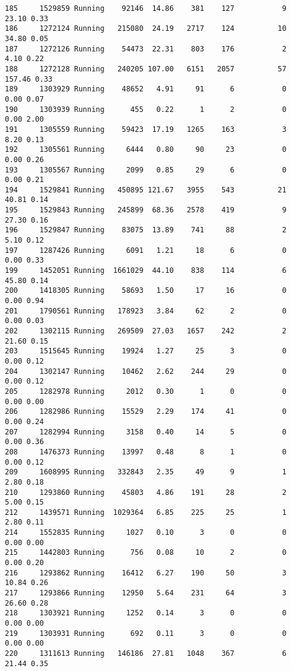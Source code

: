 \documentclass[
]{article}
\begin{document}
\begin{verbatim}
185     1529859 Running    92146  14.86    381    127           9   23.10 0.33
186     1272124 Running   215080  24.19   2717    124          10   34.80 0.05
187     1272126 Running    54473  22.31    803    176           2    4.10 0.22
188     1272128 Running   240205 107.00   6151   2057          57  157.46 0.33
189     1303929 Running    48652   4.91     91      6           0    0.00 0.07
190     1303939 Running      455   0.22      1      2           0    0.00 2.00
191     1305559 Running    59423  17.19   1265    163           3    8.20 0.13
192     1305561 Running     6444   0.80     90     23           0    0.00 0.26
193     1305567 Running     2099   0.85     29      6           0    0.00 0.21
194     1529841 Running   450895 121.67   3955    543          21   40.81 0.14
195     1529843 Running   245899  68.36   2578    419           9   27.30 0.16
196     1529847 Running    83075  13.89    741     88           2    5.10 0.12
197     1287426 Running     6091   1.21     18      6           0    0.00 0.33
199     1452051 Running  1661029  44.10    838    114           6   45.80 0.14
200     1418305 Running    58693   1.50     17     16           0    0.00 0.94
201     1790561 Running   178923   3.84     62      2           0    0.00 0.03
202     1302115 Running   269509  27.03   1657    242           2   21.60 0.15
203     1515645 Running    19924   1.27     25      3           0    0.00 0.12
204     1302147 Running    10462   2.62    244     29           0    0.00 0.12
205     1282978 Running     2012   0.30      1      0           0    0.00 0.00
206     1282986 Running    15529   2.29    174     41           0    0.00 0.24
207     1282994 Running     3158   0.40     14      5           0    0.00 0.36
208     1476373 Running    13997   0.48      8      1           0    0.00 0.12
209     1608995 Running   332843   2.35     49      9           1    2.80 0.18
210     1293860 Running    45803   4.86    191     28           2    5.00 0.15
212     1439571 Running  1029364   6.85    225     25           1    2.80 0.11
214     1552835 Running     1027   0.10      3      0           0    0.00 0.00
215     1442803 Running      756   0.08     10      2           0    0.00 0.20
216     1293862 Running    16412   6.27    190     50           3   10.84 0.26
217     1293866 Running    12950   5.64    231     64           3   26.60 0.28
218     1303921 Running     1252   0.14      3      0           0    0.00 0.00
219     1303931 Running      692   0.11      3      0           0    0.00 0.00
220     1311613 Running   146186  27.81   1048    367           6   21.44 0.35

\end{verbatim}
\end{document}
